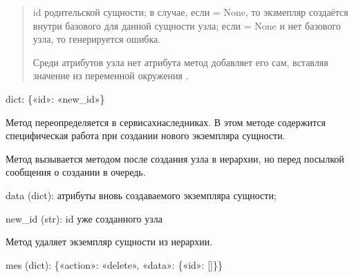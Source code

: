 \documentclass[a4paper,10pt,russian]{sphinxmanual}
\begin{document}
\begin{fulllineitems}
\begin{fulllineitems}
\begin{description}
\begin{quote}
\sphinxAtStartPar
{} \sphinxhyphen{} id родительской сущности; в случае, если = None,
то экзмепляр создаётся внутри базового для данной сущности
узла; если  = None и нет базового узла, то
генерируется ошибка.

\sphinxAtStartPar
Среди атрибутов узла нет атрибута  \sphinxhyphen{} метод
добавляет его сам, вставляя значение из переменной окружения
.
\end{quote}

\sphinxAtStartPar
dict: \{«id»: «new\_id»\}

\end{description}

\end{fulllineitems}



\begin{fulllineitems}

\pysigstartsignatures
{}
\pysigstopsignatures
\sphinxAtStartPar
Метод переопределяется в сервисах\sphinxhyphen{}наследниках.
В этом методе содержится специфическая работа при создании
нового экземпляра сущности.

\sphinxAtStartPar
Метод вызывается методом  после создания узла в иерархии,
но перед посылкой сообщения о создании в очередь.
\begin{description}
\sphinxAtStartPar
data (dict): атрибуты вновь создаваемого экземпляра сущности;

\sphinxAtStartPar
new\_id (str): id уже созданного узла

\end{description}

\end{fulllineitems}



\begin{fulllineitems}

\pysigstartsignatures
{}
\pysigstopsignatures
\sphinxAtStartPar
Метод удаляет экземпляр сущности из иерархии.
\begin{description}
\sphinxAtStartPar
mes (dict): \{«action»: «delete», «data»: \{«id»: {[}{]}\}\}


\end{description}
\end{fulllineitems}
\end{fulllineitems}
\end{document}

